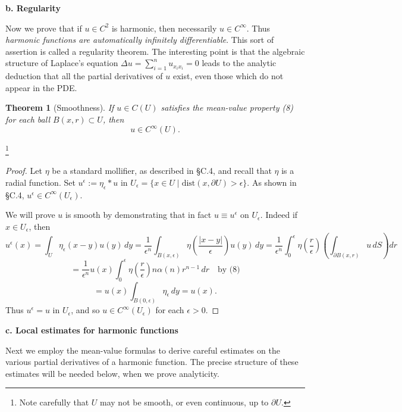 \documentclass[a4paper,12pt]{report}
\newtheorem{theorem}{Theorem}[section]
\begin{document}
\noindent
\textbf{b. Regularity}

\noindent
Now we prove that if \( u \in C^2 \) is harmonic, then necessarily \( u \in C^\infty \). Thus \textit{harmonic functions are automatically infinitely differentiable}. This sort of assertion is called a regularity theorem. The interesting point is that the algebraic structure of Laplace’s equation \( \Delta u = \sum_{i=1}^{n} u_{x_i x_i} = 0 \) leads to the analytic deduction that all the partial derivatives of \( u \) exist, even those which do not appear in the PDE.
\begin{theorem}[Smoothness]
If \( u \in C(U) \) satisfies the mean-value property (8) for each ball \( B(x,r) \subset U \), then 
\[
u \in C^\infty(U).
\]
\end{theorem}
\footnote{Note carefully that \( U \) may not be smooth, or even continuous, up to \( \partial U \).}
\begin{proof}
Let \( \eta \) be a standard mollifier, as described in §C.4, and recall that \( \eta \) is a radial function. Set \( u^\epsilon := \eta_\epsilon * u \) in \( U_\epsilon = \{ x \in U \mid \text{dist}(x, \partial U) > \epsilon \} \). As shown in §C.4, \( u^\epsilon \in C^\infty(U_\epsilon) \).

We will prove \( u \) is smooth by demonstrating that in fact \( u \equiv u^\epsilon \) on \( U_\epsilon \). Indeed if \( x \in U_\epsilon \), then
\[
u^\epsilon(x) = \int_U \eta_\epsilon(x - y) u(y) \, dy
= \frac{1}{\epsilon^n} \int_{B(x,\epsilon)} \eta\left(\frac{|x - y|}{\epsilon}\right) u(y) \, dy
= \frac{1}{\epsilon^n} \int_0^\epsilon \eta\left(\frac{r}{\epsilon}\right) \left( \int_{\partial B(x,r)} u \, dS \right) dr
\]
\[
= \frac{1}{\epsilon^n} u(x) \int_0^\epsilon \eta\left(\frac{r}{\epsilon}\right) n\alpha(n) r^{n-1} \, dr \quad \text{by (8)}
\]
\[
= u(x) \int_{B(0,\epsilon)} \eta_\epsilon \, dy = u(x).
\]
Thus \( u^\epsilon = u \) in \( U_\epsilon \), and so \( u \in C^\infty(U_\epsilon) \) for each \( \epsilon > 0 \).
\end{proof}
\noindent
\textbf{c. Local estimates for harmonic functions}

Next we employ the mean-value formulas to derive careful estimates on the various partial derivatives of a harmonic function. The precise structure of these estimates will be needed below, when we prove analyticity.
\end{document}
